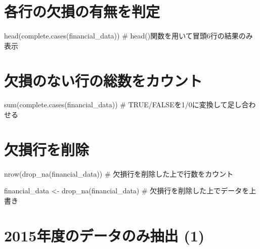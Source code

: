 \documentclass[
  letterpaper,
  DIV=11,
  numbers=noendperiod]{scrreprt}
\newenvironment{Shaded}{\begin{snugshade}}{\end{snugshade}}
\newcommand{\CommentTok}[1]{\textcolor[rgb]{0.37,0.37,0.37}{#1}}
\newcommand{\FunctionTok}[1]{\textcolor[rgb]{0.28,0.35,0.67}{#1}}
\newcommand{\NormalTok}[1]{\textcolor[rgb]{0.00,0.23,0.31}{#1}}
\newcommand{\OtherTok}[1]{\textcolor[rgb]{0.00,0.23,0.31}{#1}}
\begin{document}
\section{各行の欠損の有無を判定}\label{ux5404ux884cux306eux6b20ux640dux306eux6709ux7121ux3092ux5224ux5b9a}

\begin{Shaded}
\begin{Highlighting}[]
\FunctionTok{head}\NormalTok{(}\FunctionTok{complete.cases}\NormalTok{(financial\_data)) }\CommentTok{\# head()関数を用いて冒頭6行の結果のみ表示}
\end{Highlighting}
\end{Shaded}

\section{欠損のない行の総数をカウント}\label{ux6b20ux640dux306eux306aux3044ux884cux306eux7dcfux6570ux3092ux30abux30a6ux30f3ux30c8}

\begin{Shaded}
\begin{Highlighting}[]
\FunctionTok{sum}\NormalTok{(}\FunctionTok{complete.cases}\NormalTok{(financial\_data)) }\CommentTok{\# TRUE/FALSEを1/0に変換して足し合わせる}
\end{Highlighting}
\end{Shaded}

\section{欠損行を削除}\label{ux6b20ux640dux884cux3092ux524aux9664}

\begin{Shaded}
\begin{Highlighting}[]
\FunctionTok{nrow}\NormalTok{(}\FunctionTok{drop\_na}\NormalTok{(financial\_data)) }\CommentTok{\# 欠損行を削除した上で行数をカウント}

\NormalTok{financial\_data }\OtherTok{\textless{}{-}} \FunctionTok{drop\_na}\NormalTok{(financial\_data) }\CommentTok{\# 欠損行を削除した上でデータを上書き}
\end{Highlighting}
\end{Shaded}

\section{2015年度のデータのみ抽出
(1)}\label{ux5e74ux5ea6ux306eux30c7ux30fcux30bfux306eux307fux62bdux51fa-1}
\end{document}
